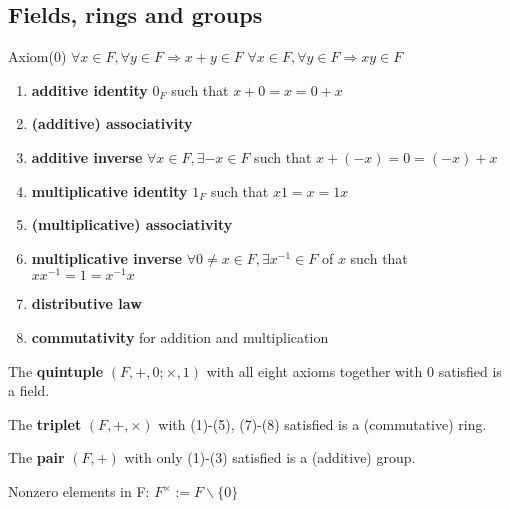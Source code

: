 \subsection{Fields, rings and groups}

Axiom(0) $\forall x \in F, \forall y \in F \Rightarrow x+y \in F$ $\forall x \in F, \forall y \in F \Rightarrow xy \in F$

\begin{enumerate}
    \item \textbf{additive identity} $0_F$ such that $x+0=x=0+x$
    \item \textbf{(additive) associativity}
    \item \textbf{additive inverse} $\forall x \in F, \exists -x \in F$ such that $x+(-x)=0=(-x)+x$
    \item \textbf{multiplicative identity} $1_F$ such that $x1=x=1x$
    \item \textbf{(multiplicative) associativity} 
    \item \textbf{multiplicative inverse} $\forall 0\neq x \in F, \exists x^{-1} \in F$ of $x$ such that $xx^{-1}=1=x^{-1}x$
    \item \textbf{distributive law}
    \item \textbf{commutativity} for addition and multiplication
\end{enumerate}

\noindent
The \textbf{quintuple} $(F,+,0;\times,1)$ with all eight axioms together with 0 satisfied is a field.

\noindent
The \textbf{triplet} $(F,+,\times)$ with (1)-(5), (7)-(8) satisfied is a (commutative) ring.

\noindent
The \textbf{pair} $(F, +)$ with only (1)-(3) satisfied is a (additive) group.

\noindent
Nonzero elements in F: $F^{\times}:=F\backslash \{0\}$

